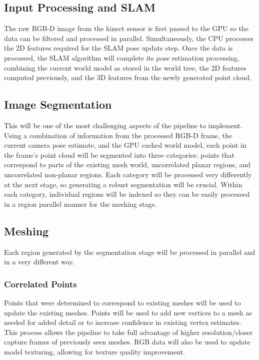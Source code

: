 \documentclass[english]{article}
\begin{document}
\subsection{Input Processing and SLAM}
The raw RGB-D image from the kinect sensor is first passed to the GPU so the data can be filtered and processed in parallel. Simultaneously, the CPU processes the 2D features required for the SLAM pose update step. Once the data is processed, the SLAM algorithm will complete its pose estimation processing, combining the current world model as stored in the world tree, the 2D features computed previously, and the 3D features from the newly generated point cloud.

\subsection{Image Segmentation}

This will be one of the most challenging aspects of the pipeline to implement. Using a combination of information from the processed RGB-D frame, the current camera pose estimate, and the GPU cached world model, each point in the frame's point cloud will be segmented into three categories: points that correspond to parts of the existing mesh world, uncorrelated planar regions, and uncorrelated non-planar regions. Each category will be processed very differently at the next stage, so generating a robust segmentation will be crucial. Within each category, individual regions will be indexed so they can be easily processed in a region parallel manner for the meshing stage.

\subsection{Meshing}
Each region generated by the segmentation stage will be processed in parallel and in a very different way.
\subsubsection{Correlated Points}
Points that were determined to correspond to existing meshes will be used to update the existing meshes. Points will be used to add new vertices to a mesh as needed for added detail or to increase confidence in existing vertex estimates. This process allows the pipeline to take full advantage of higher resolution/closer capture frames of previously seen meshes. RGB data will also be used to update model texturing, allowing for texture quality improvement.
\end{document}
